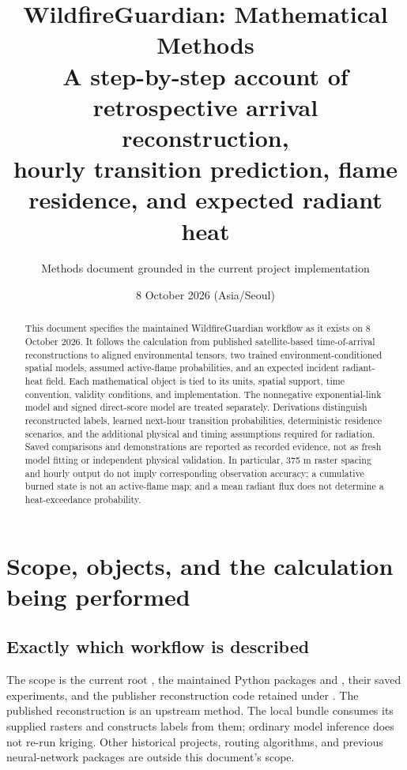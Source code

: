 \documentclass[11pt,a4paper]{article}
\title{\textbf{WildfireGuardian: Mathematical Methods}\\[5pt]
\large A step-by-step account of retrospective arrival reconstruction,\\
hourly transition prediction, flame residence, and expected radiant heat}
\author{Methods document grounded in the current project implementation}
\date{8 October 2026 (Asia/Seoul)}
\begin{document}
\maketitle
\begin{abstract}
This document specifies the maintained WildfireGuardian workflow as it exists
on 8 October 2026. It follows the calculation from published satellite-based
time-of-arrival reconstructions to aligned environmental tensors, two trained
environment-conditioned spatial models, assumed active-flame probabilities,
and an expected incident radiant-heat field. Each mathematical object is tied
to its units, spatial support, time convention, validity conditions, and
implementation. The nonnegative exponential-link model and signed direct-score
model are treated separately. Derivations distinguish reconstructed labels,
learned next-hour transition probabilities, deterministic residence scenarios,
and the additional physical and timing assumptions required for radiation.
Saved comparisons and demonstrations are reported as recorded evidence, not
as fresh model fitting or independent physical validation. In particular,
375 m raster spacing and hourly output do not imply corresponding observation
accuracy; a cumulative burned state is not an active-flame map; and a mean
radiant flux does not determine a heat-exceedance probability.
\end{abstract}
\clearpage
\tableofcontents
\clearpage

\section{Scope, objects, and the calculation being performed}
\label{sec:scope}
\subsection{Exactly which workflow is described}
The scope is the current root , the maintained Python packages
 and , their saved
experiments, and the publisher reconstruction code retained under
.
The published reconstruction is an upstream method. The local bundle consumes
its supplied rasters and constructs labels from them; ordinary model inference
does not re-run kriging. Other historical projects, routing algorithms, and
previous neural-network packages are outside this document's scope.
\end{document}
